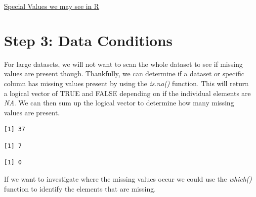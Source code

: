 \documentclass[
  letterpaper,
  DIV=11,
  numbers=noendperiod]{scrreprt}
\newenvironment{Shaded}{\begin{snugshade}}{\end{snugshade}}
\newcommand{\FunctionTok}[1]{\textcolor[rgb]{0.28,0.35,0.67}{#1}}
\newcommand{\NormalTok}[1]{\textcolor[rgb]{0.00,0.23,0.31}{#1}}
\newcommand{\SpecialCharTok}[1]{\textcolor[rgb]{0.37,0.37,0.37}{#1}}
\begin{document}
\begin{watch}{}{}
    \href{https://youtu.be/nkYpKiHXc0o}{Special Values we may see in R}
\end{watch}

\section{Step 3: Data Conditions}\label{step-3-data-conditions}

For large datasets, we will not want to scan the whole dataset to see if
missing values are present though. Thankfully, we can determine if a
dataset or specific column has missing values present by using the
\emph{is.na()} function. This will return a logical vector of TRUE and
FALSE depending on if the individual elements are \emph{NA}. We can then
sum up the logical vector to determine how many missing values are
present.

\begin{Shaded}
\end{Shaded}

\begin{verbatim}
[1] 37
\end{verbatim}

\begin{Shaded}
\end{Shaded}

\begin{verbatim}
[1] 7
\end{verbatim}

\begin{Shaded}
\end{Shaded}

\begin{verbatim}
[1] 0
\end{verbatim}

If we want to investigate where the missing values occur we could use
the \emph{which()} function to identify the elements that are missing.
\end{document}
